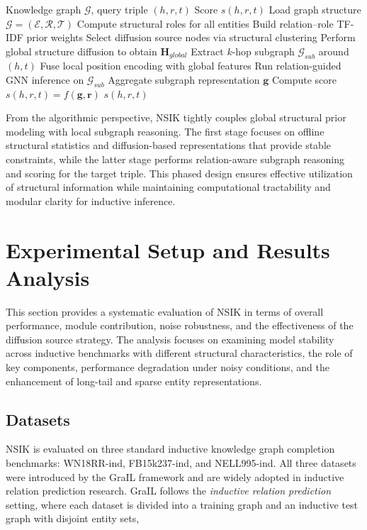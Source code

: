 \documentclass[preprint,12pt]{elsarticle}
\begin{document}
\begin{algorithm}[H]
\small
\caption{NSIK Overall Procedure}
\label{alg:nsik}
\begin{algorithmic}[1]
\Require Knowledge graph $\mathcal{G}$, query triple $(h,r,t)$
\Ensure Score $s(h,r,t)$
\State Load graph structure $\mathcal{G}=(\mathcal{E},\mathcal{R},\mathcal{T})$
\State Compute structural roles for all entities
\State Build relation–role TF-IDF prior weights
\State Select diffusion source nodes via structural clustering
\State Perform global structure diffusion to obtain $\mathbf{H}_{global}$
\State Extract $k$-hop subgraph $\mathcal{G}_{sub}$ around $(h,t)$
\State Fuse local position encoding with global features
\State Run relation-guided GNN inference on $\mathcal{G}_{sub}$
\State Aggregate subgraph representation $\mathbf{g}$
\State Compute score $s(h,r,t)=f(\mathbf{g},\mathbf{r})$
\State \Return $s(h,r,t)$
\end{algorithmic}
\end{algorithm}

From the algorithmic perspective, NSIK tightly couples global structural prior modeling with local subgraph reasoning. The first stage focuses on offline structural statistics and diffusion-based representations that provide stable constraints, while the latter stage performs relation-aware subgraph reasoning and scoring for the target triple. This phased design ensures effective utilization of structural information while maintaining computational tractability and modular clarity for inductive inference.

\section{Experimental Setup and Results Analysis}
This section provides a systematic evaluation of NSIK in terms of overall performance, module contribution, noise robustness, and the effectiveness of the diffusion source strategy. The analysis focuses on examining model stability across inductive benchmarks with different structural characteristics, the role of key components, performance degradation under noisy conditions, and the enhancement of long-tail and sparse entity representations.

\subsection{Datasets}

NSIK is evaluated on three standard inductive knowledge graph completion benchmarks: WN18RR-ind, FB15k237-ind, and NELL995-ind. All three datasets were introduced by the GraIL framework \cite{subgraph-inductive-2020} and are widely adopted in inductive relation prediction research. GraIL follows the \emph{inductive relation prediction} setting, where each dataset is divided into a training graph and an inductive test graph with disjoint entity sets,
\end{document}
